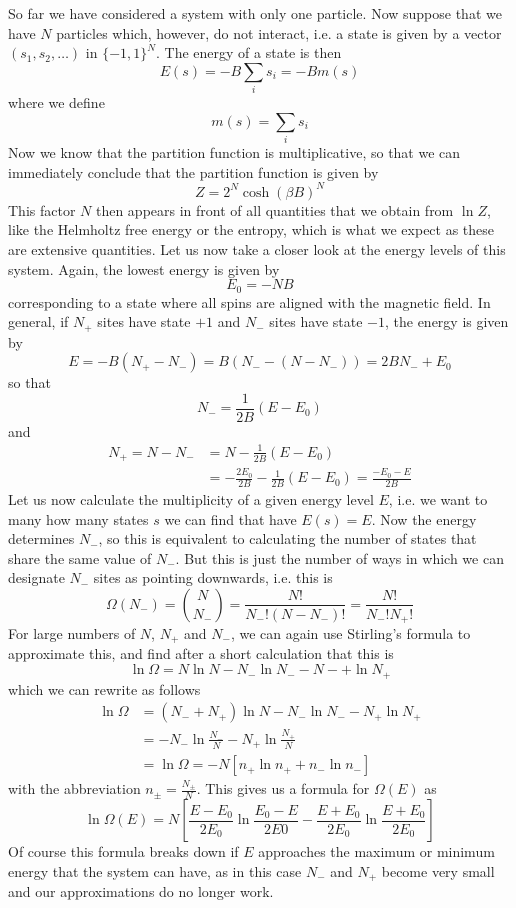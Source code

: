 \documentclass[a4paper, draft]{article}
\theoremstyle{own}
\theoremstyle{remark}
\begin{document}
So far we have considered a system with only one particle. Now suppose that we have $N$ particles which, however, do not interact, i.e. a state is given by a vector $(s_1, s_2, \dots)$ in $\{ -1, 1\}^N$. The energy of a state is then
$$
E(s) = - B \sum_i s_i = -B m(s)
$$
where we define 
$$
m(s) = \sum_i s_i
$$
Now we know that the partition function is multiplicative, so that we can immediately conclude that the partition function is given by
$$
Z =  2^N \cosh(\beta B)^N
$$
This factor $N$ then appears in front of all quantities that we obtain from $\ln Z$, like the Helmholtz free energy or the entropy, which is what we expect as these are extensive quantities. Let us now take a closer look at the energy levels of this system. Again, the lowest energy is given by 
$$
E_0 = - NB
$$
corresponding to a state where all spins are aligned with the magnetic field. In general, if $N_+$ sites have state $+1$ and $N_-$ sites have state $-1$, the energy is given by
$$
E = -B (N_+ - N_-)  = B(N_- - (N - N_-)) = 2 B N_- + E_0
$$
so that
$$
N_- = \frac{1}{2B} (E - E_0)
$$
and
\begin{align*}
N_+ = N - N_- &= N -  \frac{1}{2B} (E - E_0) \\
&= - \frac{2 E_0}{2 B} -  \frac{1}{2B} (E - E_0) = \frac{- E_0 - E}{2B}
\end{align*}
Let us now calculate the multiplicity of a given energy level $E$, i.e. we want to many how many states $s$ we can find that have $E(s) = E$. Now the energy determines $N_-$, so this is equivalent to calculating the number of states that share the same value of $N_-$. But this is just the number of ways in which we can designate $N_-$ sites as pointing downwards, i.e. this is
$$
\Omega(N_-) = \binom{N}{N_-} = \frac{N!}{N_-!(N - N_-)!} = \frac{N!}{N_-!N_+!}
$$
For large numbers of $N$, $N_+$ and $N_-$, we can again use Stirling's formula to approximate this, and find after a short calculation that this is
$$
\ln \Omega = N \ln N -N_- \ln N_- - N-+ \ln N_+
$$
which we can rewrite as follows
\begin{align*}
\ln \Omega &= (N_- + N_+) \ln N -N_- \ln N_- - N_+ \ln N_+ \\
&= - N_- \ln \frac{N_-}{N} - N_+ \ln\frac{N_+}{N}   \\
&= \ln \Omega = - N [ n_+ \ln n_+ + n_- \ln n_-  ]
\end{align*}
with the abbreviation $n_{\pm} = \frac{N_\pm}{N}$. This gives us a formula for $\Omega(E)$ as
$$
\ln \Omega(E) =  N [ \frac{E - E_0}{2E_0}\ln \frac{E_0 - E}{2E0}  - \frac{E + E_0}{2E_0}\ln \frac{E + E_0}{2E_0}  ]
$$
Of course this formula breaks down if $E$ approaches the maximum or minimum energy that the system can have, as in this case $N_-$ and $N_+$ become very small and our approximations do no longer work. 
\end{document}
